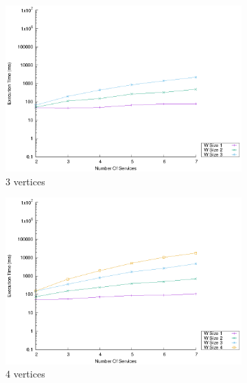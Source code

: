\begin{figure}[!htb]
  \centering
  \begin{subfigure}{0.33\textwidth}
    \includegraphics[width=\textwidth]{Images/graphs/window_time_performance_n7_s7_20_100_n3}
    \caption{3 vertices}
    \label{fig:time_window_perce_average_3n}
  \end{subfigure}
  \hfill
  \begin{subfigure}{0.33\textwidth}
    \includegraphics[width=\textwidth]{Images/graphs/window_time_performance_n7_s7_20_100_n4}
    \caption{4 vertices}
    \label{fig:time_window_perce_average_4n}
  \end{subfigure}
  \hfill
  \begin{subfigure}{0.33\textwidth}

\end{subfigure}
\end{figure}
